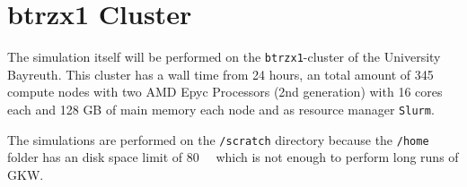 \section{btrzx1 Cluster}
\label{sec:cluster}

The simulation itself will be performed on the \texttt{btrzx1}-cluster of the University Bayreuth. This cluster has a wall time from 24 hours, an total amount of 345 compute nodes with
two AMD Epyc Processors (2nd generation) with 16 cores each and 128 GB of main memory each node and as resource manager \texttt{Slurm}. \cite{btrzx1}

The simulations are performed on the \texttt{/scratch} directory because the \texttt{/home} folder has an disk space limit of \SI{80}{\giga\byte} which is not enough to perform long runs of GKW.